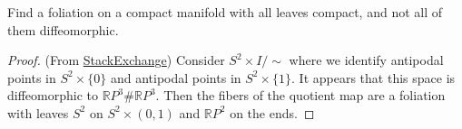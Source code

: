 \documentclass{article}
\newcommand{\R}{\mathbb{R}}
\begin{document}
\begin{exercise}
	Find a foliation on a compact manifold with all leaves compact, and not all of them diffeomorphic.
\end{exercise}
\begin{proof}

	(From \href{https://math.stackexchange.com/questions/1647836/what-can-be-said-about-the-leaves-of-a-regular-foliation}{StackExchange}) Consider $S^2\times I/\sim$ where we identify antipodal points in $S^2\times\{0\}$ and antipodal points in $S^2\times\{1\}$. It appears that this space is diffeomorphic to $\R P^3\#\R P^3$. Then the fibers of the quotient map are a foliation with leaves $S^2$ on $S^2\times(0,1)$ and $\R P^2$ on the ends.
\end{proof}
\printbibliography
\end{document}
